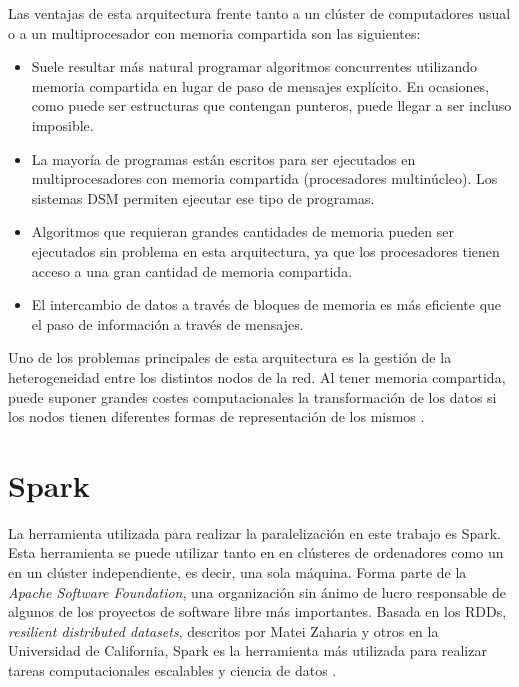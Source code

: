 \vspace{10pt}
Las ventajas de esta arquitectura frente tanto a un clúster de computadores usual o a un multiprocesador con memoria 
compartida son las siguientes:
\begin{itemize}
    \item Suele resultar más natural programar algoritmos concurrentes utilizando memoria compartida en lugar de paso
    de mensajes explícito. En ocasiones, como puede ser estructuras que contengan punteros, puede llegar a ser incluso
    imposible.
    \item La mayoría de programas están escritos para ser ejecutados en multiprocesadores con memoria compartida 
    (procesadores multinúcleo). Los sistemas DSM permiten ejecutar ese tipo de programas.
    \item Algoritmos que requieran grandes cantidades de memoria pueden ser ejecutados sin problema en esta 
    arquitectura, ya que los procesadores tienen acceso a una gran cantidad de memoria compartida.
    \item El intercambio de datos a través de bloques de memoria es más eficiente que el paso de información a través
    de mensajes.
\end{itemize}
Uno de los problemas principales de esta arquitectura es la gestión de la heterogeneidad entre los distintos nodos de
la red. Al tener memoria compartida, puede suponer grandes costes computacionales la transformación de los datos si
los nodos tienen diferentes formas de representación de los mismos \cite{nitzberg_91}.

\section{Spark}

La herramienta utilizada para realizar la paralelización en este trabajo es Spark. Esta herramienta se puede utilizar
tanto en en clústeres de ordenadores como un en un clúster independiente, es decir, una sola máquina. Forma parte 
de la \textit{Apache Software Foundation}, una organización sin ánimo de lucro responsable de algunos de los proyectos 
de software libre más importantes. Basada en los RDDs, \textit{resilient distributed datasets}, descritos por Matei 
Zaharia y otros en la Universidad de California, Spark es la herramienta más utilizada para realizar tareas 
computacionales escalables y ciencia de datos \cite{spark}.

